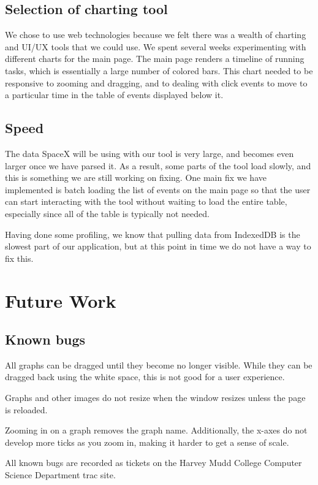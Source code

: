 \documentclass{hmcclinic}
\begin{document}
\section{Selection of charting tool} %
  We chose to use web technologies because we felt there was a wealth of
  charting and UI/UX tools that we could use. We spent several weeks
  experimenting with different charts for the main page. The main page renders a
  timeline of running tasks, which is essentially a large number of colored
  bars. This chart needed to be responsive to zooming and dragging, and to
  dealing with click events to move to a particular time in the table of events
  displayed below it.
\section{Speed} %
The data SpaceX will be using with our tool is very large, and becomes even
larger once we have parsed it. As a result, some parts of the tool load slowly,
and this is something we are still working on fixing. One main fix we have
implemented is batch loading the list of events on the main page so that the
user can start interacting with the tool without waiting to load the entire
table, especially since all of the table is typically not needed.

Having done some profiling, we know that pulling data from IndexedDB is the
slowest part of our application, but at this point in time we do not have a way
to fix this.

\chapter{Future Work}
\section{Known bugs}
  
All graphs can be dragged until they become no longer visible. While they can
be dragged back using the white space, this is not good for a user experience.

Graphs and other images do not resize when the window resizes unless the page
is reloaded.

Zooming in on a graph removes the graph name. Additionally, the x-axes do not
develop more ticks as you zoom in, making it harder to get a sense of scale.

All known bugs are recorded as tickets on the Harvey Mudd College Computer Science 
Department trac site.
\end{document}
